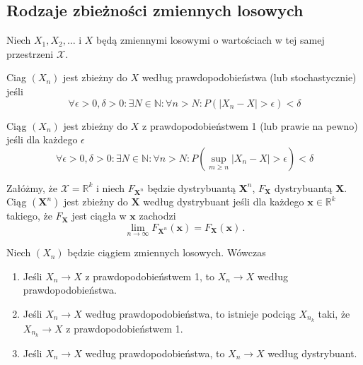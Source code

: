 \documentclass{myclass}
\numberwithin{equation}{section}
\begin{document}
\subsection{Rodzaje zbieżności zmiennych losowych}

Niech \(X_1, X_2, \ldots\) i \(X\) będą zmiennymi losowymi o wartościach w tej samej przestrzeni
\(\mathcal{X}\).

\begin{definition}
Ciag \((X_n)\) jest zbieżny do \(X\) według prawdopodobieństwa (lub stochastycznie) jeśli
\begin{equation*}
    \forall \epsilon > 0, \delta > 0 : \exists N \in \mathbb{N} : \forall n > N : P\left(|X_n - X| > \epsilon\right) < \delta
\end{equation*}
\end{definition}

\begin{definition}
Ciąg \((X_n)\) jest zbieżny do \(X\) z prawdopodobieństwem 1 (lub prawie na pewno) jeśli dla każdego
\(\epsilon\)
\begin{equation*}
    \forall \epsilon > 0, \delta > 0 : \exists N \in \mathbb{N} : \forall n > N : P\left(\sup_{m \geq n} |X_n - X| >  \epsilon\right) < \delta
\end{equation*}
\end{definition}

\begin{definition}
Załóżmy, że \(\mathcal{X} = \mathbb{R}^k\) i niech \(F_{\mathbf{X}^n}\) będzie dystrybuantą
\(\mathbf{X}^n\), \(F_\mathbf{X}\) dystrybuantą \(\mathbf{X}\). Ciąg \((\mathbf{X}^n)\) jest zbieżny
do \(\mathbf{X}\) według dystrybuant jeśli dla każdego \(\mathbf{x} \in \mathbb{R}^k\) takiego, że
\(F_\mathbf{X}\) jest ciągła w \(\mathbf{x}\) zachodzi
\begin{equation*}
    \lim_{n \to \infty} F_{\mathbf{X}^n}(\mathbf{x}) = F_\mathbf{X}(\mathbf{x})\,.
\end{equation*}
\end{definition}

\begin{theorem}
Niech \((X_n)\) będzie ciągiem zmiennych losowych. Wówczas
\begin{enumerate}

    \item Jeśli \(X_n \to X\) z prawdopodobieństwem 1, to \(X_n \to X\) według prawdopodobieństwa.

    \item Jeśli \(X_n \to X\) według prawdopodobieństwa, to istnieje podciąg \(X_{n_k}\) taki, że
    \(X_{n_k} \to X\) z prawdopodobieństwem 1.

    \item Jeśli \(X_n \to X\) według prawdopodobieństwa, to \(X_n \to X\) według dystrybuant.

\end{enumerate}
\end{theorem}
\end{document}

